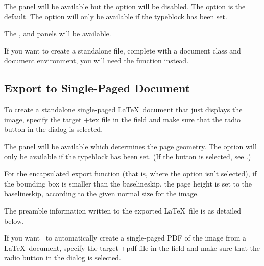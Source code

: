The  panel will be available but the
 option will be disabled.
The  option is the default.
The  option will only be available
if the \gls{typeblock} has been set.

The , 
and  panels will be available. 

If you want to create a standalone file, complete with a document
class and document environment, you will need the
 function instead.


\subsection{Export to Single-Paged Document}\label{sec:exportdoc}


To create a standalone single-paged \LaTeX\ document that just
displays the image, specify the target \ext+{tex} file in the
 field and make sure that the
 radio button in the  dialog
is selected.

The  panel will be available which determines
the page geometry.  The  option will
only be available if the \gls{typeblock} has been set.  (If the
 button is selected, see
.)

\begin{information}
For the encapsulated export function (that is, where the
 option isn't selected),
if the bounding box is smaller than the baselineskip, the page
height is set to the baselineskip, according to the given
\hyperref[sec:normalsize]{normal size} for the image.
\end{information}

The preamble information written to the exported \LaTeX\ file is as detailed below.


If you want \FlowframTk\ to automatically create a single-paged PDF 
of the image from a \LaTeX\ document, specify the target \ext+{pdf} file in the
 field and make sure that the
 radio button in the  dialog
is selected.

